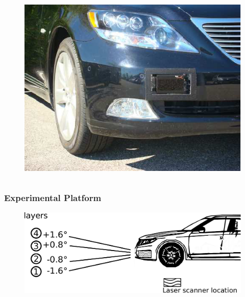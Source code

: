 \documentclass{beamer}
\begin{document}
\begin{frame}
\begin{columns}[t]
		  \begin{column}{5cm}
		  \begin{figure}[h]
			\center
			\includegraphics[scale=0.26]{../img/testbed:ibeo}
		  \end{figure}   
		  \end{column}
		 \end{columns}		 
	\end{frame}

	\begin{frame}
		\frametitle{Experimental Platform}
		\begin{figure}[h]
			\center
			\includegraphics[scale=0.4]{../img/fig:demonstrator:lateral}
		\end{figure}
	\end{frame}
\end{document}
